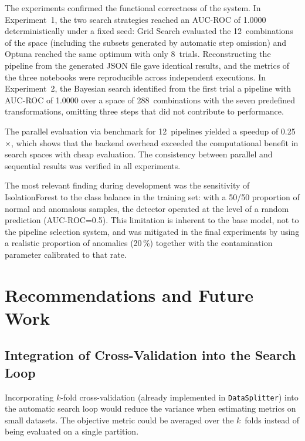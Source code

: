 \documentclass[conference]{IEEEtran}
\begin{document}
The experiments confirmed the functional correctness of the system. In
Experiment~1, the two search strategies reached an AUC-ROC of 1.0000
deterministically under a fixed seed: Grid Search evaluated the
12~combinations of the space (including the subsets generated by automatic step
omission) and Optuna reached the same optimum with only 8~trials.
Reconstructing the pipeline from the generated JSON file gave identical
results, and the metrics of the three notebooks were reproducible across
independent executions. In Experiment~2, the Bayesian search identified from
the first trial a pipeline with AUC-ROC of 1.0000 over a space of
288~combinations with the seven predefined transformations, omitting three
steps that did not contribute to performance.

The parallel evaluation via benchmark for 12~pipelines yielded a speedup of
0.25$\times$, which shows that the backend overhead exceeded the computational
benefit in search spaces with cheap evaluation. The consistency between
parallel and sequential results was verified in all experiments.

The most relevant finding during development was the sensitivity of
IsolationForest to the class balance in the training set: with a 50/50
proportion of normal and anomalous samples, the detector operated at the level
of a random prediction (AUC-ROC=0.5). This limitation is inherent to the base
model, not to the pipeline selection system, and was mitigated in the final
experiments by using a realistic proportion of anomalies (20\,\%) together with
the contamination parameter calibrated to that rate.

\section{Recommendations and Future Work}

\subsection{Integration of Cross-Validation into the Search Loop}

Incorporating $k$-fold cross-validation (already implemented in
\texttt{DataSplitter}) into the automatic search loop would reduce the variance
when estimating metrics on small datasets. The objective metric could be
averaged over the $k$~folds instead of being evaluated on a single partition.
\end{document}
